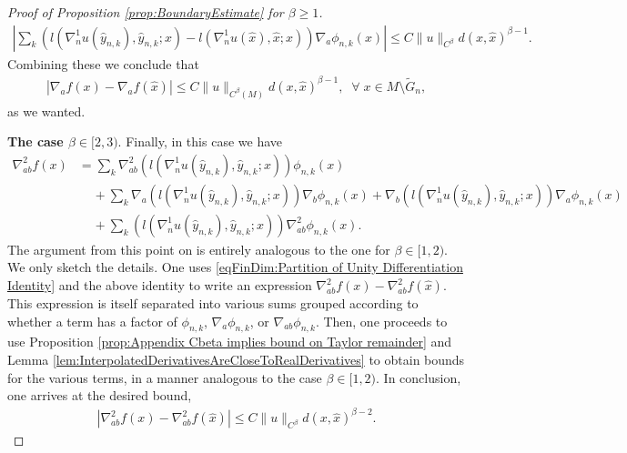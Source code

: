 \documentclass[11pt,reqno]{amsart}
\numberwithin{equation}{section}
\theoremstyle{plain}
\def\grad{\nabla}
\begin{document}
\begin{proof}[Proof of Proposition \ref{prop:BoundaryEstimate} for $\beta\geq 1$]
    \begin{align}
      \left|\sum_k \left(l( \nabla^1_n u (\hat y_{n,k}),\hat y_{n,k};x)-l( \nabla^1_n u (\hat x),\hat x;x)\right) \grad_a \phi_{n,k}(x) \right| \leq C\|u\|_{C^\beta}d(x,\hat x)^{\beta-1}.\label{eqFinDimApp:boundary estimate beta larger than 1 second term}
    \end{align}	
    Combining these we conclude that
    \begin{align*}
      |\nabla_{a}f(x)-\nabla_{a}f(\hat x)  |\leq C\|u\|_{C^\beta(M)} d(x,\hat x)^{\beta-1},\;\;\forall\;x\in M\setminus \tilde G_n,
    \end{align*}
    as we wanted.
    	
  \textbf{The case $\beta \in [2,3)$}. Finally, in this case we have
  \begin{align*}
    \nabla^{2}_{ab}f(x) & = \sum\limits_{k} \nabla^{2}_{ab}\left ( l( \nabla^1_n u (\hat y_{n,k}),\hat y_{n,k};x)\right )\phi_{n,k}(x)\\
	&\;\;\;\;+\sum\limits_{k} \nabla_{a}\left ( l( \nabla^1_n u (\hat y_{n,k}),\hat y_{n,k};x)\right )\nabla_{b}\phi_{n,k}(x)+\nabla_{b}\left ( l( \nabla^1_n u (\hat y_{n,k}),\hat y_{n,k};x)\right )\nabla_{a}\phi_{n,k}(x)\\
	& \;\;\;\;+\sum\limits_{k} \left ( l( \nabla^1_n u (\hat y_{n,k}),\hat y_{n,k};x)\right )\nabla^{2}_{ab}\phi_{n,k}(x).
  \end{align*}
  The argument from this point on is entirely analogous to the one for $\beta \in [1,2)$. We only sketch the details. One uses \eqref{eqFinDim:Partition of Unity Differentiation Identity} and the above identity to write an expression $\nabla^2_{ab}f(x)-\nabla_{ab}^2f(\hat x)$. This expression is itself separated into various sums grouped according to whether a term has a factor of $\phi_{n,k}$, $\nabla_a\phi_{n,k}$, or $\nabla_{ab}\phi_{n,k}$. Then, one proceeds to use Proposition \ref{prop:Appendix Cbeta implies bound on Taylor remainder} and Lemma \ref{lem:InterpolatedDerivativesAreCloseToRealDerivatives} to obtain bounds for the various terms, in a manner analogous to the case $\beta \in [1,2)$. In conclusion, one arrives at the desired bound,
  \begin{align*}
    |\nabla^{2}_{ab}f(x)-\nabla^{2}_{ab}f(\hat x)| \leq C\|u\|_{C^\beta}d(x,\hat x)^{\beta-2}.
  \end{align*}
\end{proof}
\end{document}
